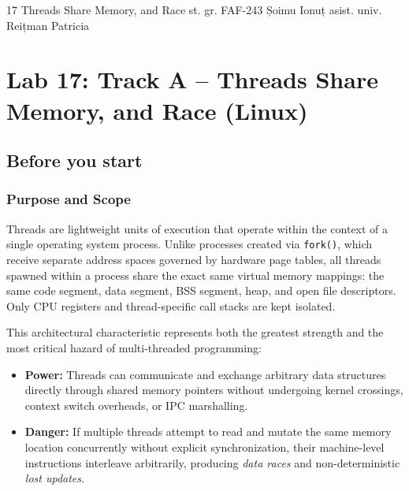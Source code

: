 \documentclass{labreport}
\begin{document}
\labtitle
    {17}
    {Threads Share Memory, and Race}
    {st. gr. FAF-243}
    {Șoimu Ionuț}
    {asist. univ.\\[0.15cm] Reițman Patricia}

\tableofcontents
\newpage

\section{Lab 17: Track A -- Threads Share Memory, and Race (Linux)}

\subsection{Before you start}

\subsubsection*{Purpose and Scope}
Threads are lightweight units of execution that operate within the context of a single operating system process. Unlike processes created via \texttt{fork()}, which receive separate address spaces governed by hardware page tables, all threads spawned within a process share the exact same virtual memory mappings: the same code segment, data segment, BSS segment, heap, and open file descriptors. Only CPU registers and thread-specific call stacks are kept isolated.

This architectural characteristic represents both the greatest strength and the most critical hazard of multi-threaded programming:
\begin{itemize}[noitemsep]
    \item \textbf{Power:} Threads can communicate and exchange arbitrary data structures directly through shared memory pointers without undergoing kernel crossings, context switch overheads, or IPC marshalling.
    \item \textbf{Danger:} If multiple threads attempt to read and mutate the same memory location concurrently without explicit synchronization, their machine-level instructions interleave arbitrarily, producing \textit{data races} and non-deterministic \textit{lost updates}.
\end{itemize}
\end{document}
